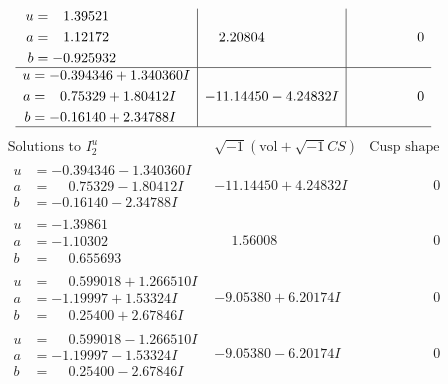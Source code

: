 \documentclass[1p]{elsarticle_modified}
\theoremstyle{definition}
\newcommand{\I}{\sqrt{-1}}
\begin{document}
$$\begin{array}{c|c|c}
\begin{aligned}
u &= \phantom{-}1.39521\phantom{ +0.000000I} \\
a &= \phantom{-}1.12172\phantom{ +0.000000I} \\
b &= -0.925932\phantom{ +0.000000I}\end{aligned}
 & \phantom{-}2.20804\phantom{ +0.000000I} & \phantom{-0.000000 } 0 \\ \hline\begin{aligned}
u &= -0.394346 + 1.340360 I \\
a &= \phantom{-}0.75329 + 1.80412 I \\
b &= -0.16140 + 2.34788 I\end{aligned}
 & -11.14450 - 4.24832 I & \phantom{-0.000000 } 0\\
 \hline 
 \end{array}$$\newpage$$\begin{array}{c|c|c}  
\text{Solutions to }I^u_{2}& \I (\text{vol} + \sqrt{-1}CS) & \text{Cusp shape}\\
 \hline 
\begin{aligned}
u &= -0.394346 - 1.340360 I \\
a &= \phantom{-}0.75329 - 1.80412 I \\
b &= -0.16140 - 2.34788 I\end{aligned}
 & -11.14450 + 4.24832 I & \phantom{-0.000000 } 0 \\ \hline\begin{aligned}
u &= -1.39861\phantom{ +0.000000I} \\
a &= -1.10302\phantom{ +0.000000I} \\
b &= \phantom{-}0.655693\phantom{ +0.000000I}\end{aligned}
 & \phantom{-}1.56008\phantom{ +0.000000I} & \phantom{-0.000000 } 0 \\ \hline\begin{aligned}
u &= \phantom{-}0.599018 + 1.266510 I \\
a &= -1.19997 + 1.53324 I \\
b &= \phantom{-}0.25400 + 2.67846 I\end{aligned}
 & -9.05380 + 6.20174 I & \phantom{-0.000000 } 0 \\ \hline\begin{aligned}
u &= \phantom{-}0.599018 - 1.266510 I \\
a &= -1.19997 - 1.53324 I \\
b &= \phantom{-}0.25400 - 2.67846 I\end{aligned}
 & -9.05380 - 6.20174 I & \phantom{-0.000000 } 0 \\ \hline\begin{aligned}

\end{aligned}
\end{array}$$
\end{document}
